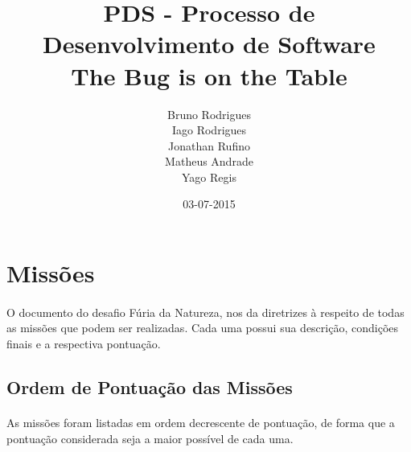 \documentclass{article}
\title{PDS - Processo de Desenvolvimento de Software\\The Bug is on the Table}
\date{03-07-2015}
\author{Bruno Rodrigues\\Iago Rodrigues\\Jonathan Rufino\\Matheus Andrade\\Yago 
Regis}
\begin{document}
	\maketitle
	\newpage

\newpage
\listoffigures

\newpage
\listoftables

\newpage
\tableofcontents

\newpage
\section{Missões}
	\paragraph{}
		O documento do desafio Fúria da Natureza, nos da diretrizes à respeito 
		de todas as missões que podem ser realizadas. Cada uma possui sua 
		descrição, condições finais e a respectiva pontuação.

	\subsection{Ordem de Pontuação das Missões}
		\paragraph{}
			As missões foram listadas em ordem decrescente de pontuação, de 
			forma que a pontuação considerada seja a maior possível de cada uma.
\end{document}
